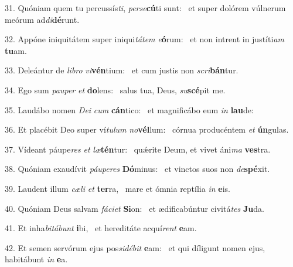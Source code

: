 31. Quóniam quem tu percussís\textit{ti}, \textit{per}\textit{se}\textbf{cú}ti sunt: \ast\  et super dolórem vúlnerum meórum ad\textit{di}\textbf{dé}runt.\

32. Appóne iniquitátem super iniqui\textit{tá}\textit{tem} \textit{e}\textbf{ó}rum: \ast\  et non intrent in justíti\textit{am} \textbf{tu}am.\

33. Deleántur de \textit{li}\textit{bro} \textit{vi}\textbf{vén}tium: \ast\  et cum justis non \textit{scri}\textbf{bán}tur.\

34. Ego sum \textit{pau}\textit{per} \textit{et} \textbf{do}lens: \ast\  salus tua, Deus, \textit{su}\textbf{scé}pit me.\

35. Laudábo nomen \textit{De}\textit{i} \textit{cum} \textbf{cán}tico: \ast\  et magnificábo eum \textit{in} \textbf{lau}de:\

36. Et placébit Deo super ví\textit{tu}\textit{lum} \textit{no}\textbf{vél}lum: \ast\  córnua producéntem \textit{et} \textbf{ún}gulas.\

37. Vídeant páupe\textit{res} \textit{et} \textit{læ}\textbf{tén}tur: \ast\  quǽrite Deum, et vivet áni\textit{ma} \textbf{ves}tra.\

38. Quóniam exaudívit \textit{páu}\textit{pe}\textit{res} \textbf{Dó}minus: \ast\  et vinctos suos non \textit{de}\textbf{spé}xit.\

39. Laudent illum \textit{cæ}\textit{li} \textit{et} \textbf{ter}ra, \ast\  mare et ómnia reptília \textit{in} \textbf{e}is.\

40. Quóniam Deus salvam \textit{fá}\textit{ci}\textit{et} \textbf{Si}on: \ast\  et ædificabúntur civitá\textit{tes} \textbf{Ju}da.\

41. Et inha\textit{bi}\textit{tá}\textit{bunt} \textbf{i}bi, \ast\  et hereditáte acquí\textit{rent} \textbf{e}am.\

42. Et semen servórum ejus pos\textit{si}\textit{dé}\textit{bit} \textbf{e}am: \ast\  et qui díligunt nomen ejus, habitábunt \textit{in} \textbf{e}a.\

